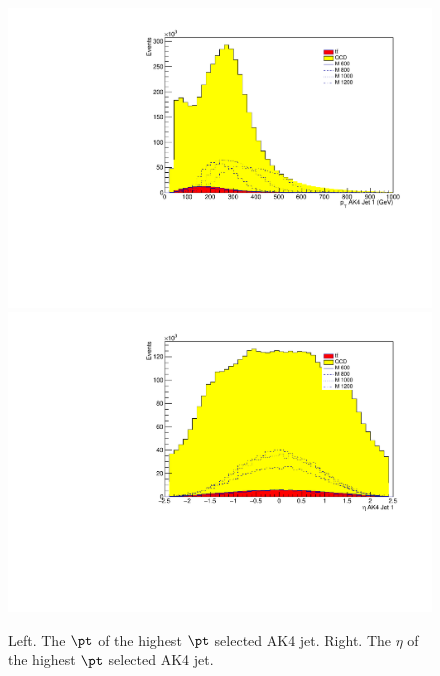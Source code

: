 \begin{figure}[thb!]
\begin{center}
\includegraphics[scale=0.34]{F5/shapeptJ1.pdf}
\includegraphics[scale=0.34]{F5/shapeetaJ1.pdf}\\
\end{center}
\caption{Left. The $\pt$ of the highest $\pt$ selected AK4 jet. Right. The $\eta$ of the highest $\pt$ selected AK4 jet.}
\label{fig:AK41pteta}
\end{figure} 

